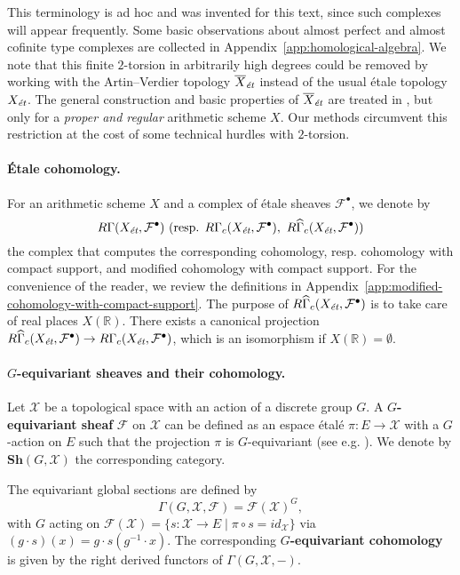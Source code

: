 \documentclass[leqno,12pt]{article}
\theoremstyle{plain}
\theoremstyle{definition}
\newcommand{\RR}{\mathbb{R}}
\newcommand{\et}{\text{\it \'{e}t}}
\begin{document}
This terminology is ad hoc and was invented for this text, since such complexes
will appear frequently. Some basic observations about almost perfect and almost
cofinite type complexes are collected in
Appendix~\ref{app:homological-algebra}. We note that this finite $2$-torsion in
arbitrarily high degrees could be removed by working with the Artin--Verdier
topology $\overline{X}_\et$ instead of the usual \'{e}tale topology $X_\et$.
The general construction and basic properties of $\overline{X}_\et$ are treated
in \cite[Appendix~A]{Flach-Morin-2018}, but only for a \emph{proper and regular}
arithmetic scheme $X$. Our methods circumvent this restriction at the cost of
some technical hurdles with $2$-torsion.

\paragraph{\'{E}tale cohomology.}
For an arithmetic scheme $X$ and a complex of \'{e}tale sheaves
$\mathcal{F}^\bullet$, we denote by
\[ R\Gamma (X_\et, \mathcal{F}^\bullet) ~
  \text{(resp. }R\Gamma_c (X_\et, \mathcal{F}^\bullet), ~
  R\widehat{\Gamma}_c (X_\et, \mathcal{F}^\bullet)\text{)} \]
the complex that computes the corresponding cohomology, resp. cohomology with
compact support, and modified cohomology with compact support.  For the
convenience of the reader, we review the definitions in
Appendix~\ref{app:modified-cohomology-with-compact-support}. The purpose of
$R\widehat{\Gamma}_c (X_\et, \mathcal{F}^\bullet)$ is to take care of real
places $X (\RR)$. There exists a canonical projection
$R\widehat{\Gamma}_c (X_\et, \mathcal{F}^\bullet) \to R\Gamma_c (X_\et,
\mathcal{F}^\bullet)$, which is an isomorphism if $X (\RR) = \emptyset$.

\paragraph{$G$-equivariant sheaves and their cohomology.}
Let $\mathcal{X}$ be a topological space with an action of a discrete group $G$.
A \textbf{$G$-equivariant sheaf} $\mathcal{F}$ on $\mathcal{X}$ can be defined
as an espace \'{e}tal\'{e} $\pi\colon E\to \mathcal{X}$ with a $G$-action on $E$
such that the projection $\pi$ is $G$-equivariant (see e.g. \cite[\S II.6 +
pp.\,594]{MacLane-Moerdijk}). We denote by $\mathbf{Sh} (G, \mathcal{X})$ the
corresponding category.

The equivariant global sections are defined by
$$\Gamma (G,\mathcal{X},\mathcal{F}) = \mathcal{F} (\mathcal{X})^G,$$
with $G$ acting on
$\mathcal{F} (\mathcal{X}) = \{ s\colon \mathcal{X}\to E \mid \pi\circ s = id_\mathcal{X} \}$
via $(g\cdot s) (x) = g\cdot s (g^{-1}\cdot x)$. The corresponding
\textbf{$G$-equivariant cohomology} is given by the right derived functors of
$\Gamma (G,\mathcal{X},-)$.
\end{document}
